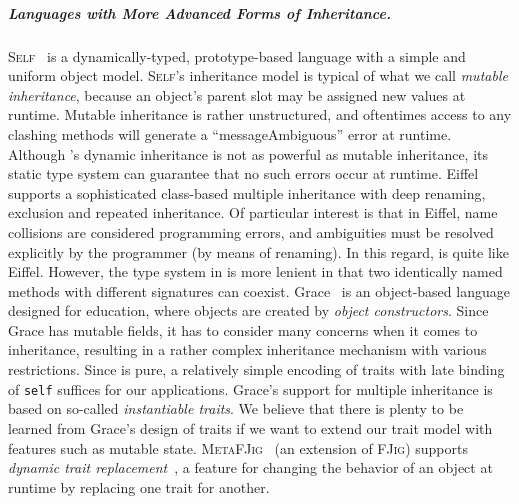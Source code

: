 \subparagraph{Languages with More Advanced Forms of Inheritance.}
\textsc{Self}~\cite{ungar1988self} is a dynamically-typed, prototype-based
language with a simple and uniform object model. \textsc{Self}'s inheritance
model is typical of what we call \textit{mutable inheritance}, because an object's parent
slot may be assigned new values at runtime. Mutable inheritance is rather
unstructured, and oftentimes access to any clashing methods will generate a
``messageAmbiguous'' error at runtime. Although \name's dynamic inheritance is
not as powerful as mutable inheritance, its static type system can guarantee
that no such errors occur at runtime. Eiffel~\cite{meyer1987eiffel} supports a
sophisticated class-based multiple inheritance with deep renaming, exclusion
and repeated inheritance. Of particular interest is that in Eiffel, name
collisions are considered programming errors, and ambiguities must be resolved
explicitly by the programmer (by means of renaming). In this regard, \name is
quite like Eiffel. However, the type system in \name is more lenient in that two
identically named methods with different signatures can coexist. Grace~\cite{DBLP:journals/jot/NobleBBHJ17, DBLP:conf/ecoop/0002HNB16}
is an object-based language designed for education, where objects are created by
\textit{object constructors}.
Since Grace has mutable fields, it has to consider
many concerns when it comes to inheritance, resulting in a rather complex
inheritance mechanism with various restrictions.
Since \name is pure, a relatively simple
encoding of traits with late binding of \lstinline{self}
suffices for our applications. Grace's support for multiple inheritance is
based on so-called \emph{instantiable traits}.
We believe that there is plenty to be learned from
Grace's design of traits if we want to extend our trait model with
features such as mutable state. \textsc{MetaFJig}~\cite{SERVETTO2014219} (an extension of \textsc{FJig})
supports \textit{dynamic trait replacement}~\cite{chai_trait, BETTINI2013907, Ducasse_2006},
a feature for changing the behavior of an object at runtime by replacing one trait for another.




